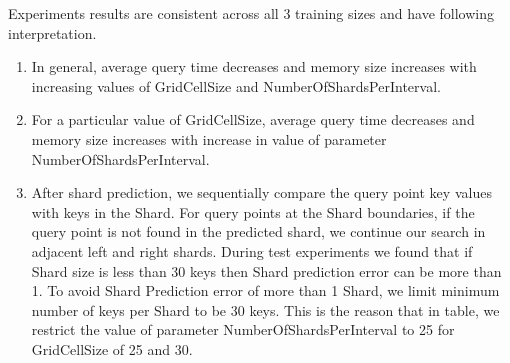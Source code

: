 Experiments results are consistent across all 3 training sizes and have following interpretation. 
\begin{enumerate}
    \item In general, average query time decreases and memory size increases with increasing values of GridCellSize and NumberOfShardsPerInterval.
	\item For a particular value of GridCellSize, average query time decreases and memory size increases with increase in value of parameter NumberOfShardsPerInterval.
	\item After shard prediction, we sequentially compare the query point key values with keys in the Shard. For query points at the Shard boundaries, if the query point is not found in the predicted shard, we continue our search in adjacent left and right shards. During test experiments we found that if Shard size is less than 30 keys then Shard prediction error can be more than 1. To avoid Shard Prediction error of more than 1 Shard, we limit minimum number of keys per Shard to be 30 keys. This is the reason that in table, we restrict the value of parameter NumberOfShardsPerInterval to 25 for GridCellSize of 25 and 30.   

\end{enumerate}

